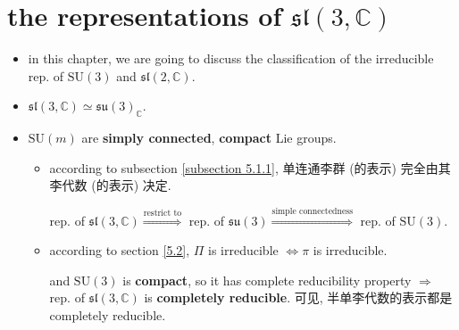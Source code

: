 \chapter{the representations of \texorpdfstring{$\mathfrak{sl}(3, \mathbb{C})$}{sl(3, C)}}
\begin{itemize}
	\item in this chapter, we are going to discuss the classification of the irreducible rep. of $\mathrm{SU}(3)$ and $\mathfrak{sl}(2, \mathbb{C})$.
	
	\item $\mathfrak{sl}(3, \mathbb{C}) \simeq \mathfrak{su}(3)_\mathbb{C}$.
	
	\item $\mathrm{SU}(m)$ are \textbf{simply connected}, \textbf{compact} Lie groups.
	\begin{itemize}
		\item according to subsection \ref{subsection 5.1.1}, 单连通李群 (的表示) 完全由其李代数 (的表示) 决定.
		
		rep. of $\mathfrak{sl}(3, \mathbb{C}) \overset{\text{restrict to}}{\Longrightarrow}$ rep. of $\mathfrak{su}(3) \overset{\text{simple connectedness}}{\Longrightarrow}$ rep. of $\mathrm{SU}(3)$.
		
		\item according to section \ref{5.2}, $\Pi$ is irreducible $\iff \pi$ is irreducible.
		
		and $\mathrm{SU}(3)$ is \textbf{compact}, so it has complete reducibility property $\Longrightarrow$ rep. of $\mathfrak{sl}(3, \mathbb{C})$ is \textbf{completely reducible}. 可见, 半单李代数的表示都是 completely reducible.
	\end{itemize}
\end{itemize}
